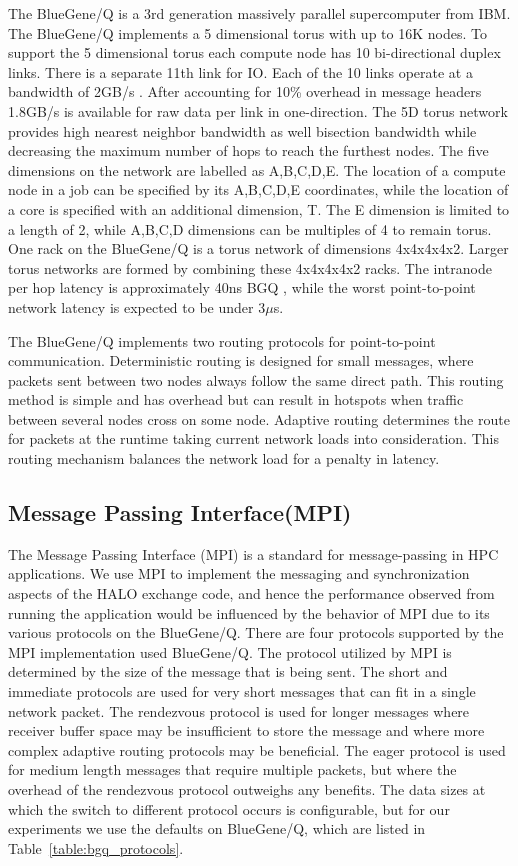 \documentclass{acm_proc_article-sp}
\begin{document}
The BlueGene/Q is a 3rd generation massively parallel supercomputer from IBM. The BlueGene/Q implements a 5 dimensional torus with up to 16K nodes.
To support the 5 dimensional torus each compute node has 10 bi-directional duplex links. There is a separate 11th link for IO. Each of the 10 links
operate at a bandwidth of 2GB/s \cite{BGQ_RedBook_2013}. After accounting for 10\% overhead in message headers 1.8GB/s is available for raw data per link in one-direction.
The 5D torus network provides high nearest neighbor bandwidth as well bisection bandwidth while decreasing the maximum number of hops to reach
the furthest nodes. The five dimensions on the network are labelled as
A,B,C,D,E.  The location of a compute node in a job can be specified
by its A,B,C,D,E coordinates, while the location of a core is specified
with an additional dimension, T. The E dimension is limited to a length
of 2, while A,B,C,D dimensions can be multiples of 4 to remain torus.
One rack on the BlueGene/Q is a torus network of dimensions 4x4x4x4x2.
Larger torus networks are formed by combining these 4x4x4x4x2 racks.
The intranode per hop latency is approximately 40ns BGQ \cite{BGQ_Interconnect_2012}, 
while the worst point-to-point network latency is expected to be under 3$\mu$s. 

The BlueGene/Q implements two routing protocols for point-to-point communication.
Deterministic routing is designed for small messages, where packets sent between two nodes always follow the same direct path.
This routing method is simple and has overhead but can result in hotspots
when traffic between several nodes cross on some node.
Adaptive routing determines the route for packets at the runtime taking current network loads into consideration.
This routing mechanism balances the network load for a penalty in latency.


\subsection{Message Passing Interface(MPI)}
The Message Passing Interface (MPI) is a standard for message-passing in HPC applications.
We use MPI to implement the messaging and synchronization aspects of the HALO exchange code,
and hence the performance observed from running the application would be influenced by the behavior of MPI due to its various protocols on the BlueGene/Q.
There are four protocols supported by the MPI implementation used BlueGene/Q.
The protocol utilized by MPI is determined by the size of the message that is being sent.  The short and immediate protocols are used for very short
messages that can fit in a single network packet.  The rendezvous
protocol is used for longer messages where receiver buffer space may
be insufficient to store the message and where more complex adaptive
routing protocols may be beneficial.  The eager protocol
is used for medium length messages that require multiple packets,
but where the overhead of the rendezvous protocol outweighs any
benefits.
The data sizes at which the switch to different protocol occurs is configurable, but for our experiments we use the defaults on BlueGene/Q, which are 
listed in Table~\ref{table:bgq_protocols}.
\end{document}
